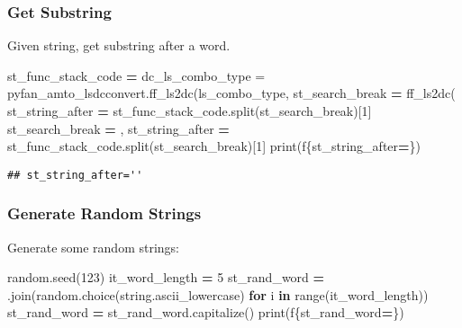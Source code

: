 \documentclass[
]{book}
\newenvironment{Shaded}{\begin{snugshade}}{\end{snugshade}}
\newcommand{\BuiltInTok}[1]{#1}
\newcommand{\ControlFlowTok}[1]{\textcolor[rgb]{0.13,0.29,0.53}{\textbf{#1}}}
\newcommand{\DecValTok}[1]{\textcolor[rgb]{0.00,0.00,0.81}{#1}}
\newcommand{\KeywordTok}[1]{\textcolor[rgb]{0.13,0.29,0.53}{\textbf{#1}}}
\newcommand{\NormalTok}[1]{#1}
\newcommand{\OperatorTok}[1]{\textcolor[rgb]{0.81,0.36,0.00}{\textbf{#1}}}
\newcommand{\SpecialCharTok}[1]{\textcolor[rgb]{0.00,0.00,0.00}{#1}}
\newcommand{\SpecialStringTok}[1]{\textcolor[rgb]{0.31,0.60,0.02}{#1}}
\newcommand{\StringTok}[1]{\textcolor[rgb]{0.31,0.60,0.02}{#1}}
\begin{document}
\hypertarget{get-substring}{%
\subsubsection{Get Substring}\label{get-substring}}

Given string, get substring after a word.

\begin{Shaded}
\begin{Highlighting}[]
\NormalTok{st\_func\_stack\_code }\OperatorTok{=} \StringTok{\textquotesingle{}dc\_ls\_combo\_type = pyfan\_amto\_lsdcconvert.ff\_ls2dc(ls\_combo\_type,\textquotesingle{}}
\NormalTok{st\_search\_break }\OperatorTok{=} \StringTok{\textquotesingle{}ff\_ls2dc(\textquotesingle{}}
\NormalTok{st\_string\_after }\OperatorTok{=}\NormalTok{ st\_func\_stack\_code.split(st\_search\_break)[}\DecValTok{1}\NormalTok{]}
\NormalTok{st\_search\_break }\OperatorTok{=} \StringTok{\textquotesingle{},\textquotesingle{}}
\NormalTok{st\_string\_after }\OperatorTok{=}\NormalTok{ st\_func\_stack\_code.split(st\_search\_break)[}\DecValTok{1}\NormalTok{]}
\BuiltInTok{print}\NormalTok{(}\SpecialStringTok{f\textquotesingle{}}\SpecialCharTok{\{}\NormalTok{st\_string\_after}\OperatorTok{=}\SpecialCharTok{\}}\SpecialStringTok{\textquotesingle{}}\NormalTok{)}
\end{Highlighting}
\end{Shaded}

\begin{verbatim}
## st_string_after=''
\end{verbatim}

\hypertarget{generate-random-strings}{%
\subsubsection{Generate Random Strings}\label{generate-random-strings}}

Generate some random strings:

\begin{Shaded}
\begin{Highlighting}[]
\NormalTok{random.seed(}\DecValTok{123}\NormalTok{)}
\NormalTok{it\_word\_length }\OperatorTok{=} \DecValTok{5}
\NormalTok{st\_rand\_word }\OperatorTok{=} \StringTok{\textquotesingle{}\textquotesingle{}}\NormalTok{.join(random.choice(string.ascii\_lowercase) }\ControlFlowTok{for}\NormalTok{ i }\KeywordTok{in} \BuiltInTok{range}\NormalTok{(it\_word\_length))}
\NormalTok{st\_rand\_word }\OperatorTok{=}\NormalTok{ st\_rand\_word.capitalize()}
\BuiltInTok{print}\NormalTok{(}\SpecialStringTok{f\textquotesingle{}}\SpecialCharTok{\{}\NormalTok{st\_rand\_word}\OperatorTok{=}\SpecialCharTok{\}}\SpecialStringTok{\textquotesingle{}}\NormalTok{)}
\end{Highlighting}
\end{Shaded}
\end{document}
